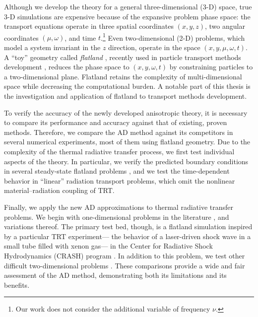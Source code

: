 Although we develop the theory for a general three-dimensional (3-D) space,
true \mbox{3-D} simulations are expensive because of the expansive problem phase
space: the transport equations operate in three spatial coordinates $(x,y,z)$,
two angular coordinates $(\mu,\omega)$, and time $t$.\footnote{%
Our work does not consider the additional variable of frequency $\nu$.}
Even two-dimensional (2-D)
problems, which model a system invariant in the $z$ direction, operate in the
space $(x,y,\mu,\omega,t)$. A ``toy'' geometry called \emph{flatland}
\cite{Abb1884}, recently used in particle transport methods development
\cite{Asa2008,Lar2009c},
reduces the phase space to $(x,y,\omega,t)$ by constraining particles to a
two-dimensional plane. Flatland retains the complexity of multi-dimensional
space while decreasing the computational burden. A notable part of this thesis
is the investigation and application of flatland to transport methods
development.

To verify the accuracy of the newly developed anisotropic theory, it is
necessary to
compare its performance and accuracy against that of existing, proven methods.
Therefore, we compare the AD method against its competitors in several numerical
experiments, most of them using flatland geometry. Due to the complexity of
the thermal radiative transfer process, we first test individual aspects of the
theory. In particular, we verify the predicted boundary conditions in several
steady-state flatland problems \cite{Joh2011a}, and we test the time-dependent
behavior in ``linear'' radiation transport problems, which omit the nonlinear
material--radiation coupling of TRT.

Finally, we apply the new AD approximations to thermal radiative transfer
problems. We begin with
one-dimensional problems in the literature \cite{Rau2005}, and variations
thereof. The primary test bed, though, is a flatland simulation
\cite{Joh2011} inspired by a particular TRT experiment---%
the behavior of a laser-driven shock wave in a small tube filled with xenon
gas---%
in the Center for Radiative Shock Hydrodynamics (CRASH) program
\cite{Crash2010}. In addition to this problem, we test other difficult
two-dimensional problems \cite{Mou2006}. These comparisons provide a wide and
fair assessment of the AD method, demonstrating both its limitations and its
benefits.


